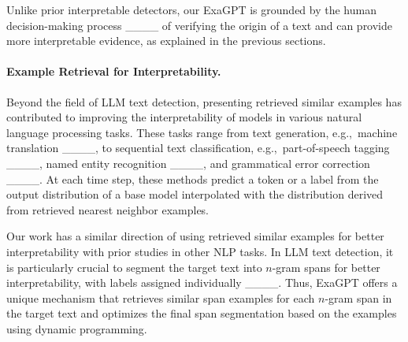 Unlike prior interpretable detectors, our ExaGPT is grounded by the human decision-making process ____ of verifying the origin of a text and can provide more interpretable evidence, as explained in the previous sections.


\paragraph{Example Retrieval for Interpretability.}
Beyond the field of LLM text detection, presenting retrieved similar examples has contributed to improving the interpretability of models in various natural language processing tasks.
These tasks range from text generation, e.g.,~machine translation ____, to sequential text classification, e.g.,~part-of-speech tagging ____, named entity recognition ____, and grammatical error correction ____.
At each time step, these methods predict a token or a label from the output distribution of a base model interpolated with the distribution derived from retrieved nearest neighbor examples.

Our work has a similar direction of using retrieved similar examples for better interpretability with prior studies in other NLP tasks. In LLM text detection, it is particularly crucial to segment the target text into $n$-gram spans for better interpretability, with labels assigned individually ____. Thus, ExaGPT offers a unique mechanism that retrieves similar span examples for each $n$-gram span in the target text and optimizes the final span segmentation based on the examples using dynamic programming.